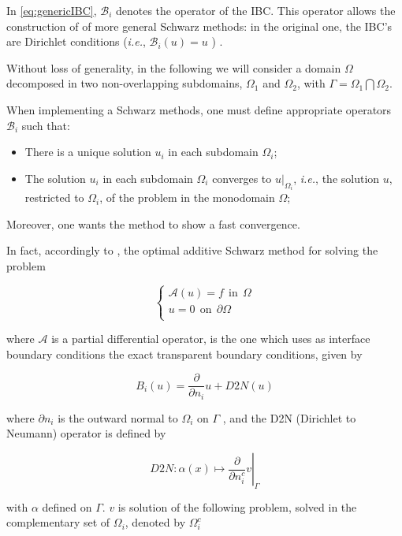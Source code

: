 \indent In \eqref{eq:genericIBC}, $\mathcal{B}_i$ denotes the operator of the IBC. This operator allows the construction of of more general Schwarz methods: in the original one, the IBC's are Dirichlet conditions (\emph{i.e.}, $\mathcal{B}_i(u) = u$  ) \cite{Japhet2003,Lions1990}.

\indent Without loss of generality, in the following we will consider a domain $\Omega$ decomposed in two non-overlapping subdomains, $\Omega_1$ and $\Omega_2$, with $\Gamma = \Omega_1 \bigcap \Omega_2$.

\indent When implementing a Schwarz methods, one must define appropriate operators $\mathcal{B}_i$ such that:

\begin{itemize}
\begingroup \item There is a unique solution $u_i$ in each subdomain $\Omega_i$; \endgroup
\item The solution $u_i$ in each subdomain $\Omega_i$ converges to $u|_{\Omega_i}$, \emph{i.e.}, the solution $u$, restricted to $\Omega_i$, of the problem in the monodomain $\Omega$;
\end{itemize} 

\indent Moreover, one wants the method to show a fast convergence.

\indent In fact, accordingly to \cite{Japhet2003}, the optimal additive Schwarz method for solving the problem 

\begin{equation*}
\begin{cases}
\mathcal{A}(u) = f \ \ \text{in} \ \ \Omega\\
u = 0 \ \ \text{on} \ \ \partial\Omega\\
\end{cases}
\end{equation*}

\noindent where $\mathcal{A}$ is a partial differential operator, is the one which uses as interface boundary conditions the exact transparent boundary conditions, given by

$$B_i(u) = \frac{\partial}{\partial n_i}u + D2N(u)$$

\noindent where $\partial n_i$ is the outward normal to $\Omega_i$ on $\Gamma$ , and the D2N (Dirichlet to Neumann) operator is defined by

$$\left. D2N : \alpha(x) \mapsto \frac{\partial}{\partial n_i^c}v \right\rvert_\Gamma$$

\noindent with $\alpha$ defined on $\Gamma$. $v$ is solution of the following problem, solved in the complementary set of $\Omega_i$, denoted by $\Omega_i^c$

